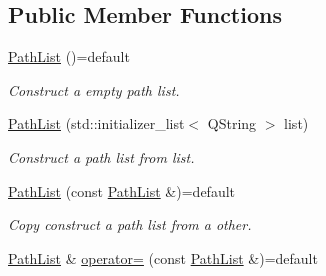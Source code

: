\subsection*{Public Member Functions}
\begin{DoxyCompactItemize}
\item 
\hyperlink{class_mdt_1_1_deploy_utils_1_1_path_list_a4a415acb1aa87350536e9e34980ed7fe}{Path\+List} ()=default\hypertarget{class_mdt_1_1_deploy_utils_1_1_path_list_a4a415acb1aa87350536e9e34980ed7fe}{}\label{class_mdt_1_1_deploy_utils_1_1_path_list_a4a415acb1aa87350536e9e34980ed7fe}

\begin{DoxyCompactList}\small\item\em Construct a empty path list. \end{DoxyCompactList}\item 
\hyperlink{class_mdt_1_1_deploy_utils_1_1_path_list_adc70e99b4aabb7edd3c6ad03a15117a8}{Path\+List} (std\+::initializer\+\_\+list$<$ Q\+String $>$ list)\hypertarget{class_mdt_1_1_deploy_utils_1_1_path_list_adc70e99b4aabb7edd3c6ad03a15117a8}{}\label{class_mdt_1_1_deploy_utils_1_1_path_list_adc70e99b4aabb7edd3c6ad03a15117a8}

\begin{DoxyCompactList}\small\item\em Construct a path list from {\itshape list}. \end{DoxyCompactList}\item 
\hyperlink{class_mdt_1_1_deploy_utils_1_1_path_list_a904588c5a1ad74269af5418749e6f8fc}{Path\+List} (const \hyperlink{class_mdt_1_1_deploy_utils_1_1_path_list}{Path\+List} \&)=default\hypertarget{class_mdt_1_1_deploy_utils_1_1_path_list_a904588c5a1ad74269af5418749e6f8fc}{}\label{class_mdt_1_1_deploy_utils_1_1_path_list_a904588c5a1ad74269af5418749e6f8fc}

\begin{DoxyCompactList}\small\item\em Copy construct a path list from a other. \end{DoxyCompactList}\item 
\hyperlink{class_mdt_1_1_deploy_utils_1_1_path_list}{Path\+List} \& \hyperlink{class_mdt_1_1_deploy_utils_1_1_path_list_a5be033c921bce08dff33e25122ea3def}{operator=} (const \hyperlink{class_mdt_1_1_deploy_utils_1_1_path_list}{Path\+List} \&)=default\hypertarget{class_mdt_1_1_deploy_utils_1_1_path_list_a5be033c921bce08dff33e25122ea3def}{}\label{class_mdt_1_1_deploy_utils_1_1_path_list_a5be033c921bce08dff33e25122ea3def}


\end{DoxyCompactItemize}

